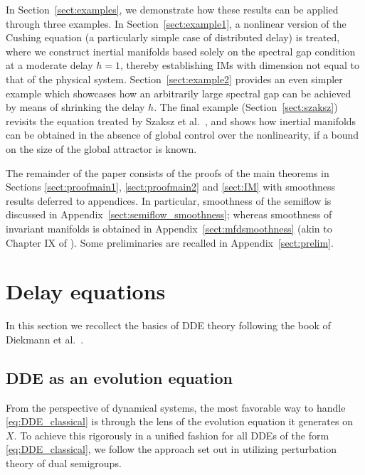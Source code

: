 \documentclass[a4paper, 12pt, oneside, reqno, notitlepage]{amsart}
\theoremstyle{plain}
\theoremstyle{definition}
\theoremstyle{remark}
\begin{document}
In Section~\ref{sect:examples}, we demonstrate how these results can be applied through three examples.
In Section~\ref{sect:example1}, a nonlinear version of the Cushing equation \cite{cushing1977time} (a particularly simple case of distributed delay) is treated, where we construct inertial manifolds based solely on the spectral gap condition at a moderate delay $h = 1$, thereby establishing IMs with dimension not equal to that of the physical system.
Section~\ref{sect:example2} provides an even simpler example which showcases how an arbitrarily large spectral gap can be achieved by means of shrinking the delay $h$.
The final example (Section~\ref{sect:szaksz}) revisits the equation treated by Szaksz et al.~\cite{szaksz2025spectral}, and shows how inertial manifolds can be obtained in the absence of global control over the nonlinearity, if a bound on the size of the global attractor is known.

The remainder of the paper consists of the proofs of the main theorems in Sections \ref{sect:proofmain1}, \ref{sect:proofmain2} and \ref{sect:IM} with smoothness results deferred to appendices. 
In particular, smoothness of the semiflow is discussed in Appendix~\ref{sect:semiflow_smoothness}; whereas smoothness of invariant manifolds is obtained in Appendix~\ref{sect:mfdsmoothness} (akin to Chapter IX of \cite{diekmann2012delay}).
Some preliminaries are recalled in Appendix~\ref{sect:prelim}.



\section{Delay equations}
\label{sect:DDEs}




In this section we recollect the basics of DDE theory following the book of Diekmann et al.~\cite{diekmann2012delay}.


\subsection{DDE as an evolution equation}



From the perspective of dynamical systems, the most favorable way to handle
\eqref{eq:DDE_classical} is through the lens of the evolution equation it generates on $X$.
To achieve this rigorously in a unified fashion for all DDEs of the form \eqref{eq:DDE_classical}, we follow the approach set out in \cite{diekmann2012delay}  utilizing perturbation theory of dual semigroups.
\end{document}

